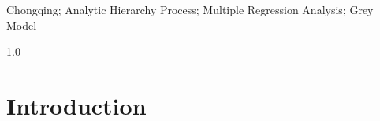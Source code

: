 \documentclass{mcmthesis}
\begin{document}
\begin{keywords}
Chongqing; Analytic Hierarchy Process; Multiple Regression Analysis; Grey Model
\end{keywords}

\maketitle

\newpage
{} 
\renewcommand{\contentsname}{\hfill Contents \hfill}
\setcounter{tocdepth}{3} 
\begin{spacing}{1.0} 
    \tableofcontents
\end{spacing}
\setcounter{page}{2} 
\newpage

\section{Introduction}

\end{document}
